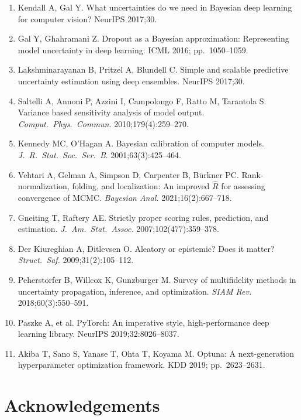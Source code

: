 \documentclass[11pt,a4paper]{article}
\begin{document}
\begin{enumerate}
      2017;112(518):859--877.
\item Kendall A, Gal Y. What uncertainties do we need in Bayesian deep
      learning for computer vision? NeurIPS 2017;30.
\item Gal Y, Ghahramani Z. Dropout as a Bayesian approximation:
      Representing model uncertainty in deep learning. ICML 2016;
      pp.\ 1050--1059.
\item Lakshminarayanan B, Pritzel A, Blundell C. Simple and scalable
      predictive uncertainty estimation using deep ensembles. NeurIPS
      2017;30.
\item Saltelli A, Annoni P, Azzini I, Campolongo F, Ratto M,
      Tarantola S. Variance based sensitivity analysis of model output.
      \textit{Comput.\ Phys.\ Commun.} 2010;179(4):259--270.
\item Kennedy MC, O'Hagan A. Bayesian calibration of computer models.
      \textit{J.\ R.\ Stat.\ Soc.\ Ser.\ B}. 2001;63(3):425--464.
\item Vehtari A, Gelman A, Simpson D, Carpenter B, B{\"u}rkner PC.
      Rank-normalization, folding, and localization: An improved
      $\hat{R}$ for assessing convergence of MCMC. \textit{Bayesian
      Anal.} 2021;16(2):667--718.
\item Gneiting T, Raftery AE. Strictly proper scoring rules, prediction,
      and estimation. \textit{J.\ Am.\ Stat.\ Assoc.}
      2007;102(477):359--378.
\item Der Kiureghian A, Ditlevsen O. Aleatory or epistemic? Does it
      matter? \textit{Struct.\ Saf.} 2009;31(2):105--112.
\item Peherstorfer B, Willcox K, Gunzburger M. Survey of multifidelity
      methods in uncertainty propagation, inference, and optimization.
      \textit{SIAM Rev.} 2018;60(3):550--591.
\item Paszke A, et al. PyTorch: An imperative style, high-performance
      deep learning library. NeurIPS 2019;32:8026--8037.
\item Akiba T, Sano S, Yanase T, Ohta T, Koyama M. Optuna: A
      next-generation hyperparameter optimization framework. KDD 2019;
      pp.\ 2623--2631.
\end{enumerate}

\section*{Acknowledgements}
\end{document}
